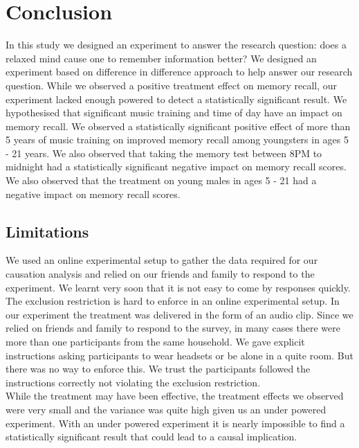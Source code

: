 \documentclass[journal,onecolumn, 12pt]{article}
\begin{document}
\section {Conclusion}

In this study we designed an experiment to answer the research question: does a relaxed mind cause one to remember information better? We designed an experiment based on difference in difference approach to help answer our research question. While we observed a positive treatment effect on memory recall, our experiment lacked enough powered to detect a statistically significant result. We hypothesised that significant music training and time of day have an impact on memory recall. We observed a statistically significant positive effect of more than 5 years of music training on improved memory recall among youngsters in ages 5 - 21 years. We also observed that taking the memory test between 8PM to midnight had a statistically significant negative impact on memory recall scores. We also observed that the treatment on young males in ages 5 - 21 had a negative impact on memory recall scores.

\subsection{Limitations}

We used an online experimental setup to gather the data required for our causation analysis and relied on our friends and family to respond to the experiment. We learnt very soon that it is not easy to come by responses quickly. \\

The exclusion restriction is hard to enforce in an online experimental setup. In our experiment the treatment was delivered in the form of an audio clip. Since we relied on friends and family to respond to the survey, in many cases there were more than one participants from the same household. We gave explicit instructions asking participants to wear headsets or be alone in a quite room. But there was no way to enforce this. We trust the participants followed the instructions correctly not violating the exclusion restriction. \\

While the treatment may have been effective, the treatment effects we observed were very small and the variance was quite high given us an under powered experiment. With an under powered experiment it is nearly impossible to find a statistically significant result that could lead to a causal implication. 
\end{document}
